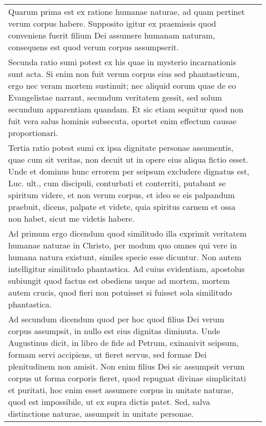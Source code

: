 \documentclass[10pt]{jsarticle} %
\begin{document}
\begin{longtable}{p{21em}p{21em}}
Quarum prima est ex ratione humanae naturae, ad quam pertinet
verum corpus habere. Supposito igitur ex praemissis quod conveniens
fuerit filium Dei assumere humanam naturam, consequens est quod verum
corpus assumpserit. 



&



\\

Secunda ratio sumi potest ex his quae in mysterio
incarnationis sunt acta. Si enim non fuit verum corpus eius sed
phantasticum, ergo nec veram mortem sustinuit; nec aliquid eorum quae de
eo Evangelistae narrant, secundum veritatem gessit, sed solum secundum
apparentiam quandam. Et sic etiam sequitur quod non fuit vera salus
hominis subsecuta, oportet enim effectum causae proportionari. 



&



\\

Tertia
ratio potest sumi ex ipsa dignitate personae assumentis, quae cum sit
veritas, non decuit ut in opere eius aliqua fictio esset. Unde et
dominus hunc errorem per seipsum excludere dignatus est, Luc. ult., cum
discipuli, conturbati et conterriti, putabant se spiritum videre, et non
verum corpus, et ideo se eis palpandum praebuit, dicens, palpate et
videte, quia spiritus carnem et ossa non habet, sicut me videtis habere.


&


\\



Ad primum ergo dicendum quod similitudo illa exprimit veritatem humanae
naturae in Christo, per modum quo omnes qui vere in humana natura
existunt, similes specie esse dicuntur. Non autem intelligitur
similitudo phantastica. Ad cuius evidentiam, apostolus subiungit quod
factus est obediens usque ad mortem, mortem autem crucis, quod fieri non
potuisset si fuisset sola similitudo phantastica.


&


\\




Ad secundum dicendum quod per hoc quod filius Dei verum corpus
assumpsit, in nullo est eius dignitas diminuta. Unde Augustinus dicit,
in libro de fide ad Petrum, exinanivit seipsum, formam servi accipiens,
ut fieret servus, sed formae Dei plenitudinem non amisit. Non enim
filius Dei sic assumpsit verum corpus ut forma corporis fieret, quod
repugnat divinae simplicitati et puritati, hoc enim esset assumere
corpus in unitate naturae, quod est impossibile, ut ex supra dictis
patet. Sed, salva distinctione naturae, assumpsit in unitate personae.



\end{longtable}
\end{document}
